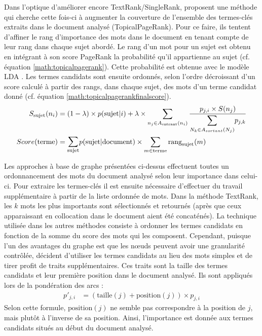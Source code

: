         Dans l'optique d'améliorer encore TextRank/SingleRank,
        \citet{liu2010topicalpagerank} proposent une méthode qui cherche cette
        fois-ci à augmenter la couverture de l'ensemble des termes-clés extraits
        dans le document analysé (TopicalPageRank). Pour ce faire, ils tentent
        d'affiner le rang d'importance des mots dans le document en tenant compte
        de leur rang dans chaque sujet abordé. Le rang d'un mot pour un sujet est
        obtenu en intégrant à son score PageRank la probabilité qu'il appartienne
        au sujet (cf. équation \ref{math:topicalpagerank}). Cette probabilité est
        obtenue avec le modèle LDA \citep{blei2003lda}. Les termes candidats
        sont ensuite ordonnés, selon l'ordre décroissant d'un score calculé à
        partir des rangs, dans chaque sujet, des mots d'un terme candidat donné
        (cf. équation \ref{math:topicalpagerankfinalscore}).
        \begin{align}
          S_{\text{sujet}}(n_i) &= (1 - \lambda) \times p(\text{sujet} | i) + \lambda \times \sum_{n_j \in A_{\text{entrant}}(n_i)} \frac{p_{j, i} \times S(n_j)}{\mathlarger{\sum}_{N_k \in A_{sortant}(N_j)} p_{j, k}} \label{math:topicalpagerank}\\
          Score(\text{terme}) &= \mathlarger{\sum}_{\text{sujet}} p(\text{sujet} | \text{document}) \times \sum_{m \in \text{terme}} \text{rang}_{\text{sujet}}(m) \label{math:topicalpagerankfinalscore}
        \end{align}

        Les approches à base de graphe présentées ci-dessus effectuent toutes un
        ordonnancement des mots du document analysé selon leur importance dans
        celui-ci. Pour extraire les termes-clés il est ensuite nécessaire
        d'effectuer du travail supplémentaire à partir de la liste ordonnée de
        mots. Dans la méthode TextRank, les $k$ mots les plus importants sont
        sélectionnés et retournés (après que ceux apparaissant en collocation dans
        le document aient été concaténés). La technique utilisée dans les autres
        méthodes consiste à ordonner les termes candidats en fonction de la somme
        du score des mots qui les composent. Cependant, puisque l'un des avantages
        du graphe est que les n\oe{}uds peuvent avoir une granularité contrôlée,
        \citet{liang2009querylog} décident d'utiliser les termes candidats au lieu des
        mots simples et de tirer profit de traits supplémentaires. Ces traits sont
        la taille des termes candidats et leur première position dans le document
        analysé. Ils sont appliqués lors de la pondération des arcs :
        \begin{align}
          p'_{j, i} &= (\text{taille}(j) + \text{position}(j)) \times p_{j, i}
        \end{align}
        Selon cette formule, $\text{position}(j)$ ne semble pas correspondre à
        la position de $j$, mais plutôt à l'inverse de sa position. Ainsi,
        l'importance est donnée aux termes candidats situés au début du document analysé.


